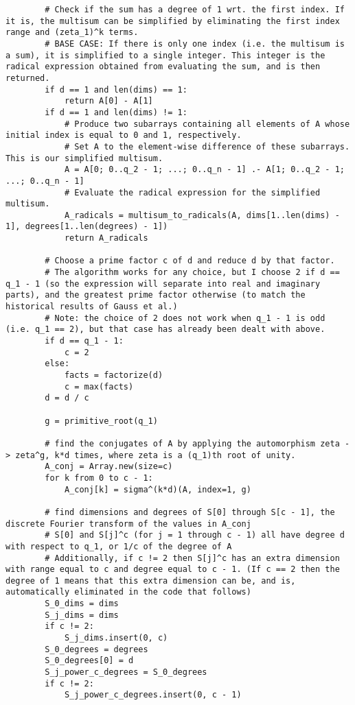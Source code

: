\documentclass{article}
\begin{document}
\begin{lstlisting}
        # Check if the sum has a degree of 1 wrt. the first index. If it is, the multisum can be simplified by eliminating the first index range and (zeta_1)^k terms.
        # BASE CASE: If there is only one index (i.e. the multisum is a sum), it is simplified to a single integer. This integer is the radical expression obtained from evaluating the sum, and is then returned.
        if d == 1 and len(dims) == 1:
            return A[0] - A[1]
        if d == 1 and len(dims) != 1:
            # Produce two subarrays containing all elements of A whose initial index is equal to 0 and 1, respectively.
            # Set A to the element-wise difference of these subarrays. This is our simplified multisum.
            A = A[0; 0..q_2 - 1; ...; 0..q_n - 1] .- A[1; 0..q_2 - 1; ...; 0..q_n - 1]
            # Evaluate the radical expression for the simplified multisum.
            A_radicals = multisum_to_radicals(A, dims[1..len(dims) - 1], degrees[1..len(degrees) - 1])
            return A_radicals

        # Choose a prime factor c of d and reduce d by that factor.
        # The algorithm works for any choice, but I choose 2 if d == q_1 - 1 (so the expression will separate into real and imaginary parts), and the greatest prime factor otherwise (to match the historical results of Gauss et al.)
        # Note: the choice of 2 does not work when q_1 - 1 is odd (i.e. q_1 == 2), but that case has already been dealt with above.
        if d == q_1 - 1:
            c = 2
        else:
            facts = factorize(d)
            c = max(facts)
        d = d / c

        g = primitive_root(q_1)

        # find the conjugates of A by applying the automorphism zeta -> zeta^g, k*d times, where zeta is a (q_1)th root of unity.
        A_conj = Array.new(size=c)
        for k from 0 to c - 1:
            A_conj[k] = sigma^(k*d)(A, index=1, g)

        # find dimensions and degrees of S[0] through S[c - 1], the discrete Fourier transform of the values in A_conj
        # S[0] and S[j]^c (for j = 1 through c - 1) all have degree d with respect to q_1, or 1/c of the degree of A
        # Additionally, if c != 2 then S[j]^c has an extra dimension with range equal to c and degree equal to c - 1. (If c == 2 then the degree of 1 means that this extra dimension can be, and is, automatically eliminated in the code that follows)
        S_0_dims = dims
        S_j_dims = dims
        if c != 2:
            S_j_dims.insert(0, c)
        S_0_degrees = degrees
        S_0_degrees[0] = d
        S_j_power_c_degrees = S_0_degrees
        if c != 2:
            S_j_power_c_degrees.insert(0, c - 1)


\end{lstlisting}
\end{document}
